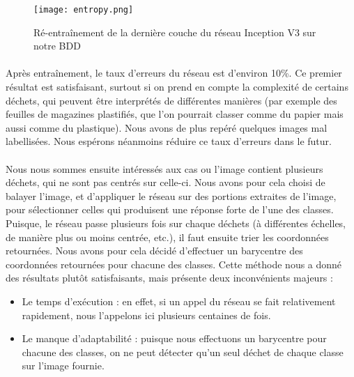 \documentclass[12pt,a4paper,twocolumn]{article}
\begin{document}
\begin{figure}[H]
	\center
	\texttt{[image: entropy.png]}
	\caption{Ré-entraînement de la dernière couche du réseau Inception V3 sur notre BDD}
	\label{entropy}
\end{figure}

\paragraph*{}

Après entraînement, le taux d’erreurs du réseau est d’environ 10\%. Ce premier résultat est satisfaisant, surtout si on prend en compte la complexité de certains déchets, qui peuvent être interprétés de différentes manières (par exemple des feuilles de magazines plastifiés, que l’on pourrait classer comme du papier mais aussi comme du plastique). Nous avons de plus repéré quelques images mal labellisées. Nous espérons néanmoins réduire ce taux d’erreurs dans le futur.

\paragraph*{}

Nous nous sommes ensuite intéressés aux cas ou l’image contient plusieurs déchets, qui ne sont pas centrés sur celle-ci. Nous avons pour cela choisi de balayer l’image, et d’appliquer le réseau sur des portions extraites de l’image, pour sélectionner celles qui produisent une réponse forte de l’une des classes. Puisque, le réseau passe plusieurs fois sur chaque déchets (à différentes échelles, de manière plus ou moins centrée, etc.), il faut ensuite trier les coordonnées retournées. Nous avons pour cela décidé d’effectuer un barycentre des coordonnées retournées pour chacune des classes.
Cette méthode nous a donné des résultats plutôt satisfaisants, mais présente deux inconvénients majeurs :
\begin{itemize}
  \item Le temps d’exécution : en effet, si un appel du réseau se fait relativement rapidement, nous l’appelons ici plusieurs centaines de fois.
  \item Le manque d'adaptabilité : puisque nous effectuons un barycentre pour chacune des classes, on ne peut détecter qu’un seul déchet de chaque classe sur l’image fournie.
\end{itemize}

\paragraph*{}
\end{document}
